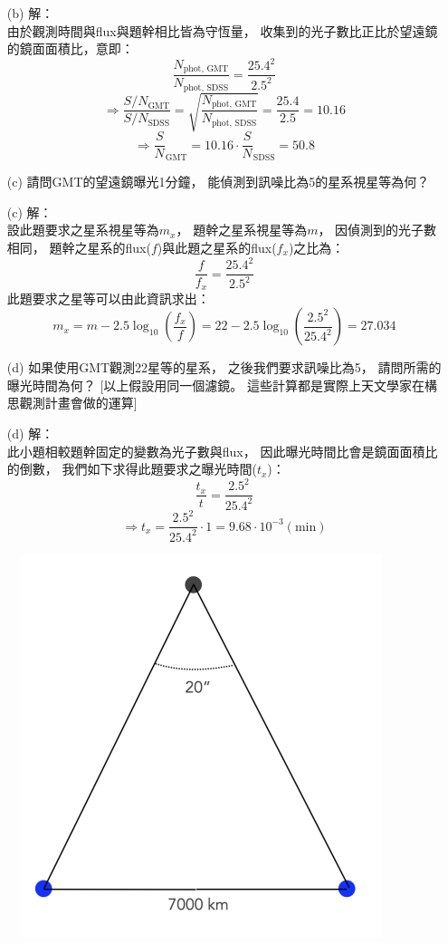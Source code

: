 \documentclass{article}
\theoremstyle{definition}
\begin{document}
\begin{enumerate}
\begin{enumerate}
			\item[(b)] 解：\\
				由於觀測時間與flux與題幹相比皆為守恆量，
				收集到的光子數比正比於望遠鏡的鏡面面積比，意即：
				\[
					\frac{N_{\text{phot, GMT}}}{N_{\text{phot, SDSS}}} = \frac{25.4^2}{2.5^2}
				\]
				\[
					\Rightarrow \frac{S/N_{\text{GMT}}}{S/N_{\text{SDSS}}} = \sqrt{\frac{N_{\text{phot, GMT}}}{N_{\text{phot, SDSS}}}} = \frac{25.4}{2.5} = 10.16
				\]
				\[
					\Rightarrow \frac{S}{N}_{\text{GMT}} = 10.16 \cdot \frac{S}{N}_{\text{SDSS}} = 50.8
				\]

			\item[(c)] 請問GMT的望遠鏡曝光1分鐘，
				能偵測到訊噪比為5的星系視星等為何？

			\item[(c)] 解：\\
				設此題要求之星系視星等為$m_x$，
				題幹之星系視星等為$m$，
				因偵測到的光子數相同，
				題幹之星系的flux($f$)與此題之星系的flux($f_x$)之比為：
				\[
					\frac{f}{f_x} = \frac{25.4^2}{2.5^2}
				\]
				此題要求之星等可以由此資訊求出：
				\[
					m_x = m - 2.5 \log_{10} \left( \frac{f_x}{f} \right) = 22 - 2.5 \log_{10} \left( \frac{2.5^2}{25.4^2} \right) = 27.034
				\]
				
			\item[(d)] 如果使用GMT觀測22星等的星系，
				之後我們要求訊噪比為5，
				請問所需的曝光時間為何？
				[以上假設用同一個濾鏡。
				這些計算都是實際上天文學家在構思觀測計畫會做的運算]

			\item[(d)] 解：\\
				此小題相較題幹固定的變數為光子數與flux，
				因此曝光時間比會是鏡面面積比的倒數，
				我們如下求得此題要求之曝光時間($t_x$)：
				\[
					\frac{t_x}{t} = \frac{2.5^2}{25.4^2}
				\]
				\[
					\Rightarrow t_x = \frac{2.5^2}{25.4^2} \cdot 1 = 9.68 \cdot 10^{-3} (\text{min})
				\]
		\end{enumerate}

		\begin{figure}[H]
			\centering
			\includegraphics[scale = 0.8]{hw1-1.png}
			\caption{}
			\label{fig1}
		\end{figure}


\end{enumerate}
\end{document}
